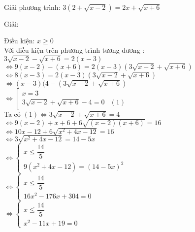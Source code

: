 \begin{vd}
  Giải phương trình: $ 3\left( 2+\sqrt{x-2} \right) =2x +\sqrt{x+6} $
\end{vd}
\begin{center}
    Giải:
\end{center}

Điều kiện: $ x \geq 0 $ \\
Với điều kiện trên phương trình tương đương : \\
$ 3 \sqrt{x-2} -\sqrt{x+6} = 2(x-3) $\\
$ \Leftrightarrow 9 (x-2) - (x+6) = 2(x-3) \left( 3 \sqrt{x-2 } + \sqrt{x+6 } \right) $ \\
$ \Leftrightarrow 8(x - 3) =2(x-3) \left( 3\sqrt{x-2 } + \sqrt{x+6 } \right) $ \\
$ \Leftrightarrow (x-3) ( 4 - \left( 3\sqrt{x-2 } + \sqrt{x+6} \right) $ \\
$ \Leftrightarrow \left[
    \begin{array}{lr}
        x  = 3 & \\
        3\sqrt{x-2 } + \sqrt{ x+ 6} -4 =0 & (1)  
    \end{array}
\right. $\\
Ta có $(1) \Leftrightarrow 3\sqrt{x-2 } + \sqrt{x+6} =4 $\\
$ \Leftrightarrow 9(x-2) + x+6 + 6\sqrt{(x-2)(x+6)} =16 $\\
$ \Leftrightarrow 10x - 12 +6 \sqrt{x^2 +4x -12 } =16 $ \\
$ \Leftrightarrow 3 \sqrt{x^2 +4x -12 } = 14 -5x $\\
$ \Leftrightarrow \begin{cases}
    x \leq  \dfrac{14}{5} \\
    9(x^2 + 4x -12) = (14 -5x)^2 
\end{cases} $ \\
$ \Leftrightarrow \begin{cases}
    x \leq \dfrac{14}{5} \\
    16x^2 - 176x +304 = 0
\end{cases} $ \\
$ \Leftrightarrow \begin{cases}
     x \leq \dfrac{14}{5} \\
     x^2 -11x + 19 =0
\end{cases} $ \\

